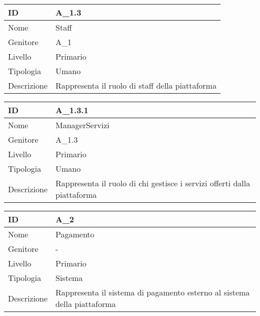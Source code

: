 \begin{center}
\begin{tabular}{ |p{2cm}|p{10cm}|  }
\hline
ID & A\_1.3 \\\hline
Nome & Staff\\\hline
Genitore & A\_1\\\hline
Livello &  Primario \\\hline
Tipologia & Umano \\\hline
Descrizione &  Rappresenta il ruolo di staff della piattaforma \\\hline
\end{tabular}
\label{table_attore:1.3}\newline

\begin{tabular}{ |p{2cm}|p{10cm}|  }
\hline
ID & A\_1.3.1 \\\hline
Nome & ManagerServizi\\\hline
Genitore & A\_1.3\\\hline
Livello &  Primario \\\hline
Tipologia & Umano \\\hline
Descrizione &  Rappresenta il ruolo di chi gestisce i servizi offerti dalla piattaforma \\\hline
\end{tabular}
\label{table_attore:1.3.1}\newline

\begin{tabular}{ |p{2cm}|p{10cm}|  }
\hline
ID & A\_2 \\\hline
Nome & Pagamento\\\hline
Genitore & - \\\hline
Livello &  Primario \\\hline
Tipologia & Sistema \\\hline
Descrizione &  Rappresenta il sistema di pagamento esterno al sistema della piattaforma \\\hline
\end{tabular}
\label{table_attore:2}\newline




\end{center}
